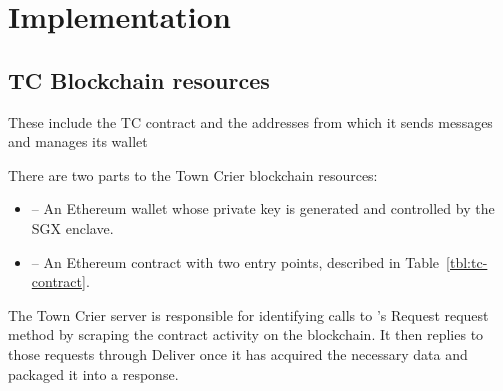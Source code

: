 \section{Implementation}

\subsection{TC Blockchain resources}
These include the TC contract and the addresses from which it sends messages and manages its wallet

There are two parts to the Town Crier blockchain resources:
\begin{itemize}
  \item \sgxadd -- An Ethereum wallet whose private key is generated and controlled by the SGX enclave.
  
  \item \tcont -- An Ethereum contract with two entry points, described in Table~\ref{tbl:tc-contract}.
\end{itemize}
The Town Crier server is responsible for identifying calls to \tcont's Request request method by scraping the contract activity on the blockchain.
It then replies to those requests through Deliver once it has acquired the necessary data and packaged it into a response.

